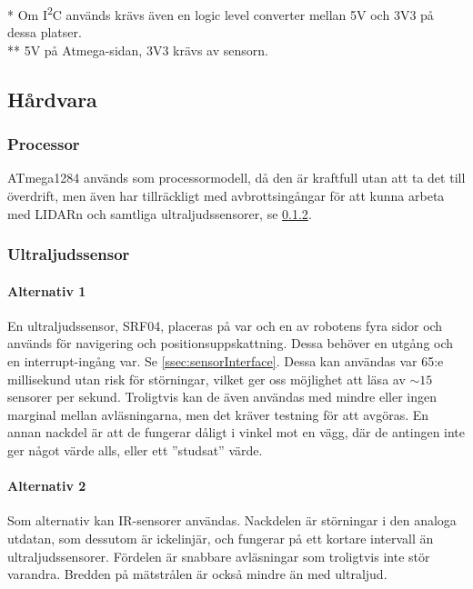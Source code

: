 \documentclass[a4paper,11pt]{article}
\begin{document}
\noindent \begin{small}
    * Om I\textsuperscript{2}C används krävs även en logic level converter mellan 5V och 3V3 på dessa platser.\\
    ** 5V på Atmega-sidan, 3V3 krävs av sensorn.
\end{small}
\subsection{Hårdvara}

\subsubsection{Processor}
ATmega1284 används som processormodell, då den är kraftfull utan att ta det till överdrift, men även har tillräckligt med avbrottsingångar för att kunna arbeta med LIDARn och samtliga ultraljudssensorer, se \ref{sssec:sonicsensors}.

\subsubsection{Ultraljudssensor} \label{sssec:sonicsensors}
\paragraph{Alternativ 1}
En ultraljudssensor, SRF04, placeras på var och en av robotens fyra sidor och används för navigering och positionsuppskattning. Dessa behöver en utgång och en interrupt-ingång var. Se \ref{ssec:sensorInterface}. Dessa kan användas var 65:e millisekund utan risk för störningar, vilket ger oss möjlighet att läsa av $\sim15$ sensorer per sekund. Troligtvis kan de även användas med mindre eller ingen marginal mellan avläsningarna, men det kräver testning för att avgöras. En annan nackdel är att de fungerar dåligt i vinkel mot en vägg, där de antingen inte ger något värde alls, eller ett ''studsat'' värde. %

\paragraph{Alternativ 2}
Som alternativ kan IR-sensorer användas. Nackdelen är störningar i den analoga utdatan, som dessutom är ickelinjär, och fungerar på ett kortare intervall än ultraljudssensorer. Fördelen är snabbare avläsningar som troligtvis inte stör varandra. Bredden på mätstrålen är också mindre än med ultraljud.
\end{document}
